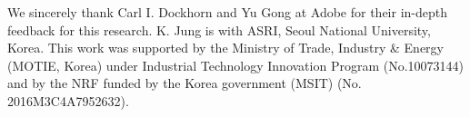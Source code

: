 \documentclass[sigconf]{acmart}
\begin{document}
\begin{acks}
We sincerely thank Carl I. Dockhorn and Yu Gong at Adobe for their in-depth feedback for this research. 
K. Jung is with ASRI, Seoul National University, Korea.
This work was supported by the Ministry of Trade, Industry \& Energy (MOTIE, Korea) under Industrial Technology Innovation Program (No.10073144) and by the NRF funded by the Korea government (MSIT) (No. 2016M3C4A7952632).
\end{acks}






\end{document}
